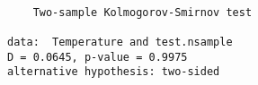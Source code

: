 \begin{verbatim} 

	Two-sample Kolmogorov-Smirnov test

data:  Temperature and test.nsample
D = 0.0645, p-value = 0.9975
alternative hypothesis: two-sided

\end{verbatim}